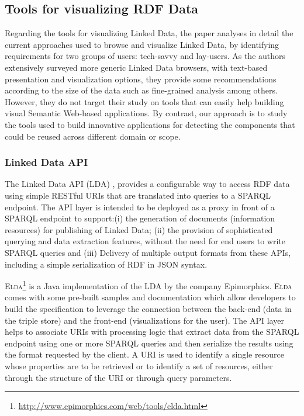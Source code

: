 \subsection{Tools for visualizing RDF Data}
\label{sec:vizrdf}
Regarding the tools for visualizing Linked Data,  the paper \cite{aba2011} analyses in detail the current approaches used to browse and visualize Linked Data, by identifying requirements for two groups of users: tech-savvy and lay-users. As the authors extensively surveyed more generic Linked Data browsers, with text-based presentation and visualization options, they provide some recommendations according to the size of the data such as fine-grained analysis among others. However, they do not target their study on tools that can easily help building visual Semantic Web-based applications. By contrast, our approach is to study the tools used to build innovative applications for detecting the components that could be reused across different domain or scope.


\subsubsection{Linked Data API}
The Linked Data API (LDA) \cite{ldapi}, provides a configurable way to access RDF data using simple RESTful URIs that are translated into queries to a SPARQL endpoint. The API layer is intended to be deployed as a proxy in front of a SPARQL endpoint to support:(i) the generation of documents (information resources) for publishing of Linked Data; (ii) the provision of sophisticated querying and data extraction features, without the need for end users to write SPARQL queries and (iii) Delivery of multiple output formats from these APIs, including a simple serialization of RDF in JSON syntax.

\textsc{Elda}\footnote{\url{http://www.epimorphics.com/web/tools/elda.html}} is a Java implementation of the LDA by the company Epimorphics. \textsc{Elda} comes with some pre-built samples and documentation which allow developers to build the specification to leverage the connection between the back-end (data in the triple store) and the front-end (visualizations for the user). The API layer helps to associate URIs with processing logic that extract data from the SPARQL endpoint using one or more SPARQL queries and then serialize the results using the format requested by the client. A URI is used to identify a single resource whose properties are to be retrieved or to identify a set of resources, either through the structure of the URI or through query parameters.

